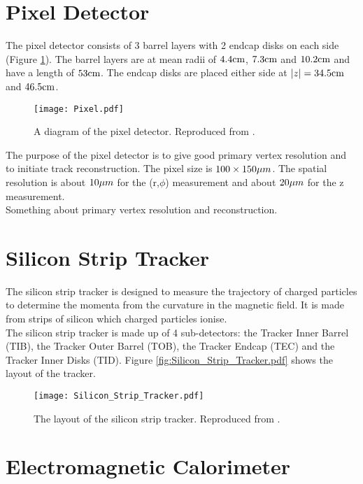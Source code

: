 \section{Pixel Detector}

The pixel detector consists of 3 barrel layers with 2 endcap disks on each side
(Figure \ref{fig:Pixel}). The barrel layers are at mean radii of $4.4\mbox{cm}$,
$7.3\mbox{cm}$ and $10.2\mbox{cm}$ and have a length of $53\mbox{cm}$. The endcap disks are placed 
either side at $|z| = 34.5\mbox{cm}$ and $46.5\mbox{cm}$. \\

\begin{figure}
\texttt{[image: Pixel.pdf]}
\label{fig:Pixel}
\caption{A diagram of the pixel detector. Reproduced from \cite{physics_tdr_1}.}
\end{figure}

The purpose of the pixel detector is to give good primary vertex resolution and
to initiate track reconstruction. The pixel size is $100\times150\mu m$. The 
spatial resolution is about $10\mu m$ for the (r,$\phi$) measurement and about 
$20\mu m$ for the z measurement. \\

Something about primary vertex resolution and reconstruction.

\section{Silicon Strip Tracker}

The silicon strip tracker is designed to measure the trajectory of charged 
particles to determine the momenta from the curvature in the magnetic field. It 
is made from strips of silicon which charged particles ionise. \\

The silicon strip tracker is made up of 4 sub-detectors: the Tracker Inner 
Barrel (TIB), the Tracker Outer Barrel (TOB), the Tracker Endcap (TEC) and the
Tracker Inner Disks (TID). Figure \ref{fig:Silicon_Strip_Tracker.pdf} shows the 
layout of the tracker.

\begin{figure}
\texttt{[image: Silicon\_Strip\_Tracker.pdf]}
\label{fig:Silicon_Strip_Tracker}
\caption{The layout of the silicon strip tracker. Reproduced from 
\cite{physics_tdr_1}.}
\end{figure}

\section{Electromagnetic Calorimeter}

